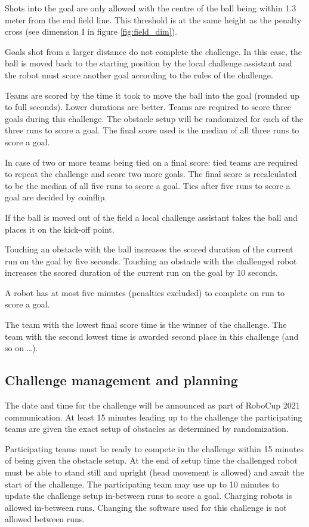 Shots into the goal are only allowed with the centre of the ball being within 1.3 meter from the end field line. This threshold is at the same height as the penalty cross (see dimension I in figure \ref{fig:field_dim}).

Goals shot from a larger distance do not complete the challenge. In this case, the ball is moved back to the starting position by the local challenge assistant and the robot must score another goal according to the rules of the challenge.

Teams are scored by the time it took to move the ball into the goal (rounded up to full seconds). Lower durations are better. Teams are required to score three goals during this challenge. The obstacle setup will be randomized for each of the three runs to score a goal. The final score used is the median of all three runs to score a goal. 

In case of two or more teams being tied on a final score: tied teams are required to repeat the challenge and score two more goals. The final score is recalculated to be the median of all five runs to score a goal. Ties after five runs to score a goal are decided by coinflip.

If the ball is moved out of the field a local challenge assistant takes the ball and places it on the kick-off point.

Touching an obstacle with the ball increases the scored duration of the current run on the goal by five seconds. Touching an obstacle with the challenged robot increases the scored duration of the current run on the goal by 10 seconds.

A robot has at most five minutes (penalties excluded) to complete on run to score a goal.

The team with the lowest final score time is the winner of the challenge. The team with the second lowest time is awarded second place in this challenge (and so on \ldots).

\subsection{Challenge management and planning}

The date and time for the challenge will be announced as part of RoboCup 2021 communication. At least 15 minutes leading up to the challenge the participating teams are given the exact setup of obstacles as determined by randomization.

Participating teams must be ready to compete in the challenge within 15 minutes of being given the obstacle setup. At the end of setup time the challenged robot must be able to stand still and upright (head movement is allowed) and await the start of the challenge. The participating team may use up to 10 minutes to update the challenge setup in-between runs to score a goal. Charging robots is allowed in-between runs. Changing the software used for this challenge is not allowed between runs.

